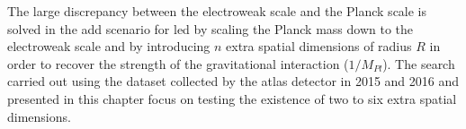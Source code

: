 The large discrepancy between the electroweak scale and the Planck scale is
solved in the \gls{add} scenario for \gls{led} by scaling the Planck mass down
to the electroweak scale and by introducing $n$ extra spatial dimensions of
radius $R$ in order to recover the strength of the gravitational interaction
($1/M_{Pl}$). The search carried out using the dataset collected by the
\gls{atlas} detector in 2015 and 2016 and presented in this chapter focus on
testing the existence of two to six extra spatial dimensions.
